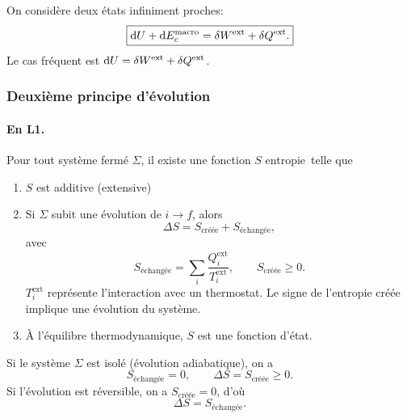                 On considère deux états infiniment proches:
                \begin{equation}
                    \boxed{
                        \mathrm{d} U+\mathrm{d} E_c^{\text{macro}}=\delta W^{\text{ext}}+\delta Q^{\text{ext}}.
                    }
                \end{equation}
                Le cas fréquent est $\mathrm{d} U=\delta W^{\text{ext}}+\delta Q^{\text{ext}}$.

        \subsubsection{Deuxième principe \og d'évolution\fg}

            \paragraph{En L1.}
                Pour tout système fermé $\Sigma$, il existe une fonction $S$ \og entropie\fg~telle que
                \begin{enumerate}
                    \item $S$ est additive (extensive)
                    \item Si $\Sigma$ subit une évolution de $i\to f$, alors
                    \begin{equation}
                        \boxed{
                            \Delta S=S_{\text{créée}}+S_{\text{échangée}},
                        }
                    \end{equation}
                    avec
                    \begin{equation}
                        S_{\text{échangée}}=\sum_{i}\frac{Q_i^{\text{ext}}}{T_i^{\text{ext}}},\qquad S_{\text{créée}}\geqslant 0.
                    \end{equation}
                    $T_i^{\text{ext}}$ représente l'interaction avec un thermostat. Le signe de l'entropie créée implique une évolution du système.
                    \item À l'équilibre thermodynamique, $S$ est une fonction d'état.
                \end{enumerate}

                Si le système $\Sigma$ est isolé (évolution adiabatique), on a 
                \begin{equation}
                    \boxed{
                        S_{\text{échangée}}=0,\qquad\Delta S=S_{\text{créée}}\geqslant0.
                    }
                \end{equation}
                Si l'évolution est réversible, on a $S_{\text{créée}}=0$, d'où 
                \begin{equation}
                    \boxed{
                        \Delta S=S_{\text{échangée}}.
                    }
                \end{equation}

